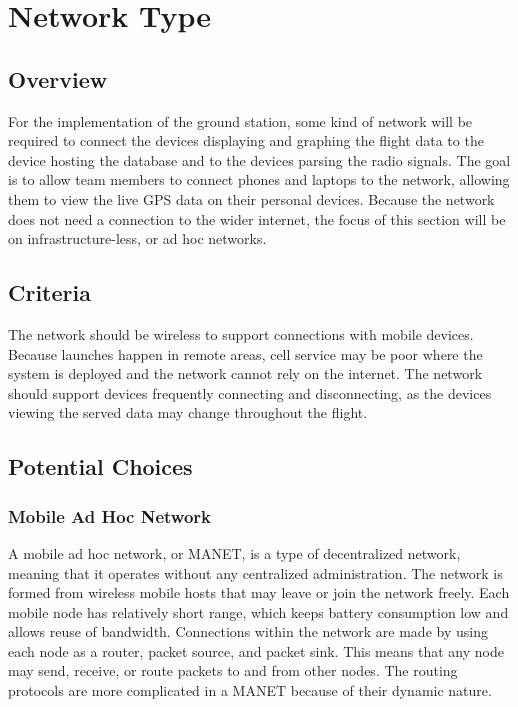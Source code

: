 \documentclass[onecolumn, draftclsnofoot,10pt, compsoc]{IEEEtran}
\begin{document}
\section{Network Type}

\subsection{Overview}
 For the implementation of the ground station, some kind of network will be required to connect the devices displaying and graphing the flight data to the device hosting the database and to the devices parsing the radio signals. 
 The goal is to allow team members to connect phones and laptops to the network, allowing them to view the live GPS data on their personal devices.
 Because the network does not need a connection to the wider internet, the focus of this section will be on infrastructure-less, or ad hoc networks.

\subsection{Criteria}
The network should be wireless to support connections with mobile devices.
Because launches happen in remote areas, cell service may be poor where the system is deployed and the network cannot rely on the internet.
The network should support devices frequently connecting and disconnecting, as the devices viewing the served data may change throughout the flight.

\subsection{Potential Choices}

\subsubsection{Mobile Ad Hoc Network}
A mobile ad hoc network, or MANET, is a type of decentralized network, meaning that it operates without any centralized administration.
The network is formed from wireless mobile hosts that may leave or join the network freely.
Each mobile node has relatively short range, which keeps battery consumption low and allows reuse of bandwidth.
Connections within the network are made by using each node as a router, packet source, and packet sink. 
This means that any node may send, receive, or route packets to and from other nodes. 
The routing protocols are more complicated in a MANET because of their dynamic nature.\cite{1}
\end{document}
